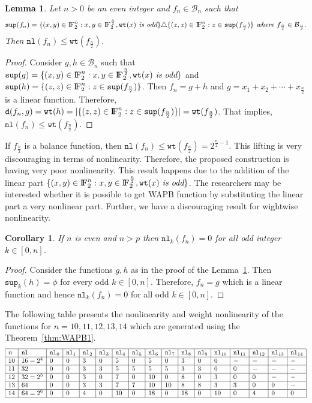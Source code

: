 \documentclass{article}[12pt]
\newtheorem{corollary}[theorem]{Corollary}
\newtheorem{lemma}[theorem]{Lemma}
\newcommand{\FF}{{\rm I\!F}}
\newcommand{\CB}{\mathcal{B}}
\newcommand{\wt}{\mathtt{wt}}
\newcommand{\spt}{\mathtt{sup}}
\newcommand{\nl}{\mathtt{nl}}
\newcommand{\ds}{\mathtt{d}}
\begin{document}
\begin{lemma}\label{lem:nl2}
Let $n > 0$ be an even integer and $f_n \in \CB_n$ such that
$$\spt(f_n) = \{(x,y) \in \FF_2^n : x,y \in \FF_2^{\frac{n}{2}}, \wt(x) \textit{ is odd}\} \triangle \{(z,z) \in \FF_2^n : z \in \spt(f_{\frac{n}{2}})\} \textit{ where } f_{\frac{n}{2}} \in \CB_{\frac{n}{2}}.$$
Then $\nl(f_n) \leq \wt(f_{\frac{n}{2}})$.
\end{lemma}
\begin{proof}
Consider $g,h \in \CB_n$ such that $\spt(g) = \{(x,y) \in \FF_2^n : x,y \in \FF_2^{\frac{n}{2}}, \wt(x) \textit{ is odd}\}$ and $\spt(h) = \{(z,z) \in \FF_2^n : z \in \spt(f_{\frac{n}{2}})\}$. Then $f_n = g + h$ and $g = x_1 + x_2 + \cdots + x_{\frac{n}{2}}$ is a linear function. Therefore, $\ds(f_n,g) = \wt(h) = |\{(z,z) \in \FF_2^n : z \in \spt(f_{\frac{n}{2}})\}| = \wt(f_{\frac{n}{2}})$. That implies, $\nl(f_n) \leq \wt(f_{\frac{n}{2}})$.
\end{proof}
If $f_{\frac{n}{2}}$ is a balance function, then $\nl(f_n) \leq \wt(f_{\frac{n}{2}}) = 2^{\frac{n}{2}-1}$. This lifting is very discouraging in terms of nonlinearity. Therefore, the proposed 
construction is having very poor nonlinearity. This result happens due to the addition of the linear part $\{(x,y) \in \FF_2^n : x,y \in \FF_2^{\frac{n}{2}}, \wt(x) \textit{ is odd}\}$. The researchers may be interested whether it is possible to get WAPB function by substituting the linear part a very nonlinear part. Further, we have a discouraging result for wightwise nonlinearity.
\begin{corollary}\label{cor:nlodd}
If $n$ is even and $n > p$ then $\nl_k(f_n) = 0$ for all odd integer $k \in [0,n]$. 
\end{corollary}
\begin{proof}
 Consider the functions $g,h$ as in the proof of the Lemma~\ref{lem:nl2}. Then $\spt_k(h) = \phi$ for every odd $k \in [0,n]$. Therefore, $f_n = g$ which is a linear function and hence $\nl_k(f_n) = 0$ for all odd $k \in [0,n]$.
\end{proof}
The following table presents the nonlinearity and weight nonlinearity of the functions for $n = 10, 11, 12, 13, 14$ which are generated using the Theorem~\ref{thm:WAPB1}.
$$\begin{array}{|l|l|l|l|l|l|l|l|l|l|l|l|l|l|l|l|l|} \hline
n & \nl & \nl_0 & \nl_1 & \nl_2 & \nl_3 & \nl_4 & \nl_5 & \nl_6 & \nl_7 & \nl_8 & \nl_9 & \nl_{10} & \nl_{11} & \nl_{12} & \nl_{13} & \nl_{14} \\ \hline
10 & 16 = 2^4 & 0 & 0 & 3 & 0 & 5 & 0 & 5 & 0 & 3 & 0 & 0 & - & - & - & - \\ \hline
11 & 32 & 0 & 0 & 3 & 3 & 5 & 5 & 5 & 5 & 3 & 3 & 0 & 0 & - & - & - \\ \hline
12 & 32 = 2^5 & 0 & 0 & 3 & 0 & 7 & 0 & 10 & 0 & 8 & 0 & 3 & 0 & 0 & - & - \\ \hline
13 & 64 & 0 & 0 & 3 & 3 & 7 & 7 & 10 & 10 & 8 & 8 & 3 & 3 & 0 & 0 & - \\ \hline
14 & 64 = 2^6 & 0 & 0 & 4 & 0 & 10 & 0 & 18 & 0 & 18 & 0 & 10 & 0 & 4 & 0 & 0 \\ \hline
\end{array}$$
\end{document}
